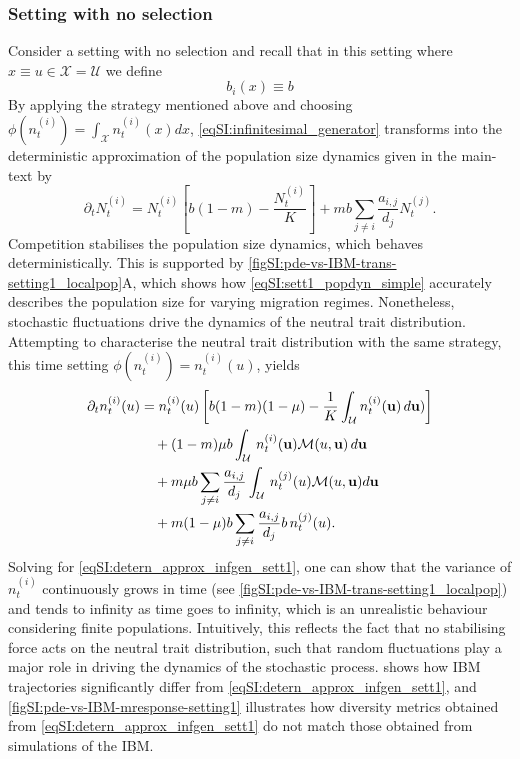     \subsubsection{Setting with no selection}
    Consider a setting with no selection and recall that in this setting where $x \equiv u \in \mathcal{X} = \mathcal{U}$ we define
    \begin{equation}\label{eqSI:b_d_sett1}
      b_i(x) \equiv b 
    \end{equation}
    By applying the strategy mentioned above and choosing $\phi(n^{(i)}_t) = \int_\mathcal{X} n^{(i)}_t(x) dx$, \cref{eqSI:infinitesimal_generator} transforms into the deterministic approximation of the population size dynamics given in the main-text by
    \begin{equation}\label{eqSI:sett1_popdyn_simple}
      \partial_t N_t^{(i)} = N_t^{(i)} \left[ b(1-m) - \frac{N_t^{(i)}}{K} \right] +  m b \sum_{j\neq i}\frac{a_{i,j}}{d_j}  N_t^{(j)} .
    \end{equation}
    Competition stabilises the population size dynamics, which behaves deterministically. This is supported by \cref{figSI:pde-vs-IBM-trans-setting1_localpop}A, which shows how \cref{eqSI:sett1_popdyn_simple} accurately describes the population size for varying migration regimes. Nonetheless, stochastic fluctuations drive the dynamics of the neutral trait distribution. Attempting to characterise the neutral trait distribution with the same strategy, this time setting $\phi(n^{(i)}_t) = n^{(i)}_t(u)$, yields
    \begin{equation}\label{eqSI:detern_approx_infgen_sett1}
    \begin{split}
    \partial_t n_t^{(i)}(u) &= n_t^{(i)}(u)\left[b(1-m)(1-\mu) - \frac{1}{K}\int_\mathcal{U} n_t^{(i)}({\textbf u}) \, d {\textbf u})\right] \\
    &\quad + (1- m)\mu b \int_\mathcal{U} \, n_t^{(i)}( {\textbf u})  \mathcal{M}( u, {\textbf u}) \, d{\textbf u} \\
    &\quad + m \mu b \sum_{j\neq i}\frac{a_{i,j}}{d_j}  \int_\mathcal{U} \,  n_t^{(j)}(u) \mathcal{M}( u, {\textbf u}) d{\textbf u}\\
    &\quad + m (1 - \mu) b \sum_{j\neq i}\frac{a_{i,j}}{d_j} b \, n_t^{(j)}(u).
  \end{split}
\end{equation}
%
Solving for \cref{eqSI:detern_approx_infgen_sett1}, one can show that the variance of $n_t^{(i)}$ continuously grows in time (see \cref{figSI:pde-vs-IBM-trans-setting1_localpop}) and tends to infinity as time goes to infinity, which is an unrealistic behaviour considering finite populations. Intuitively, this reflects the fact that no stabilising force acts on the neutral trait distribution, such that random fluctuations play a major role in driving the dynamics of the stochastic process.
%
 shows how IBM trajectories significantly differ from \cref{eqSI:detern_approx_infgen_sett1}, and \cref{figSI:pde-vs-IBM-mresponse-setting1} illustrates how diversity metrics obtained from \cref{eqSI:detern_approx_infgen_sett1} do not match those obtained from simulations of the IBM.


